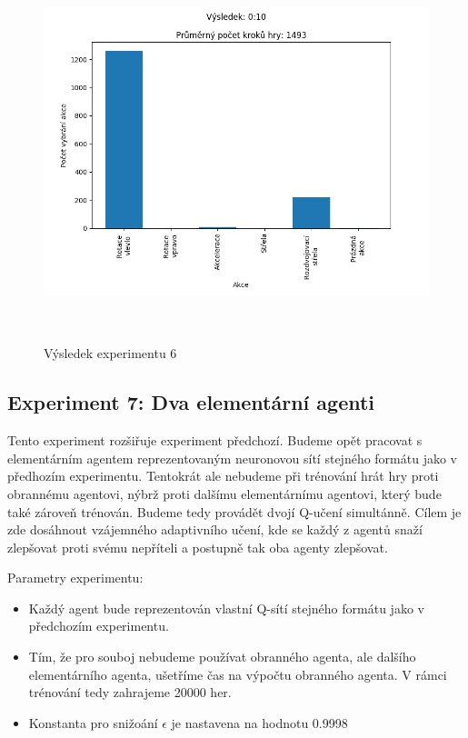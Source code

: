 \begin{figure}[p]\centering
\includegraphics[width=145mm, height=110mm]{./Obrazky/Experiment06Results.png}
\caption{Výsledek experimentu 6}
\label{Výsledek experimentu 06}
\end{figure}
    



\newpage
\subsection{Experiment 7: Dva elementární agenti}
Tento experiment rozšiřuje experiment předchozí. Budeme opět pracovat s elementárním agentem reprezentovaným neuronovou sítí stejného formátu jako v předhozím experimentu.
Tentokrát ale nebudeme při trénování hrát hry proti obrannému agentovi, nýbrž proti dalšímu elementárnímu agentovi, který bude také zároveň trénován.
Budeme tedy provádět dvojí Q-učení simultánně. Cílem je zde dosáhnout vzájemného adaptivního učení, kde se každý z agentů snaží zlepšovat proti svému nepříteli a postupně tak oba agenty zlepšovat.
\par


Parametry experimentu:
\begin{itemize}
    \item Každý agent bude reprezentován vlastní Q-sítí stejného formátu jako v předchozím experimentu.
    \item Tím, že pro souboj nebudeme používat obranného agenta, ale dalšího elementárního agenta, ušetříme čas na výpočtu obranného agenta. V rámci trénování tedy zahrajeme 20000 her.  
    \item Konstanta pro snižoání $\epsilon$ je nastavena na hodnotu 0.9998
\end{itemize}


